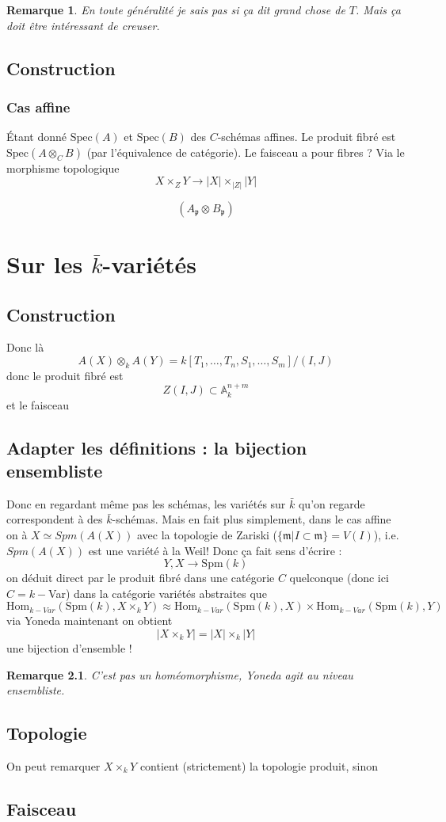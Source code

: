 \documentclass[a4paper,12pt]{book}
\newcommand{\A}{\mathbb{A}}
\newcommand{\Hom}{\textrm{Hom}}
\newcommand{\Spec}{\textrm{Spec}}
\newcommand{\Spm}{\textrm{Spm}}
\newcommand{\m}{\mathfrak{m}}
\newcommand{\p}{\mathfrak{p}}
\newcommand{\q}{\mathfrak{p}}
\theoremstyle{plain}
\newtheorem{rem}{Remarque}
\theoremstyle{definition}
\theoremstyle{remark}
\begin{document}
\begin{rem}
    En toute généralité je sais pas si ça dit grand chose de $T$. Mais
    ça doit être intéressant de creuser.
\end{rem}


\section{Construction}
\subsection{Cas affine}
Étant donné $\Spec(A)$ et $\Spec(B)$ des $C$-schémas affines. Le 
produit fibré est $\Spec(A\otimes_C B)$ (par l'équivalence de 
catégorie). Le faisceau a pour fibres ? Via le morphisme 
topologique 
\[X\times_Z Y\to |X|\times_{|Z|}|Y|\]

\[(A_\p\otimes_{} B_\q)\]
\subsection{}



\chapter{Sur les $\bar k$-variétés}
\section{Construction}
Donc là 
\[A(X)\otimes_k A(Y)=k[T_1,\ldots, T_n, S_1,\ldots, S_m]/(I,J)\]
donc le produit fibré est 
\[Z(I,J)\subset \A_k^{n+m}\]
et le faisceau
\section{Adapter les définitions : la bijection ensembliste}
Donc en regardant même pas les schémas, les variétés sur $\bar k$
qu'on regarde correspondent à des $\bar k$-schémas. Mais en 
fait plus simplement, dans le cas affine on à $X\simeq Spm(A(X))$
avec la topologie de Zariski ($\{\m|I\subset \m\}=V(I)$), i.e.
$Spm(A(X))$ est une variété à la Weil! Donc ça fait sens d'écrire :
\[Y,X\to \Spm(k)\]
on déduit direct par le produit fibré dans une catégorie $C$ 
quelconque (donc ici $C=k-$Var) dans la catégorie variétés
abstraites que
\[\Hom_{k-Var}(\Spm(k), X\times_k Y)\approx \Hom_{k-Var}(\Spm(k),X)
\times \Hom_{k-Var}(\Spm(k),Y)\]
via Yoneda maintenant on obtient 
\[|X\times_k Y|=|X|\times_k|Y|\]
une bijection d'ensemble !

\begin{rem}
  C'est pas un homéomorphisme, Yoneda agit au niveau ensembliste.
\end{rem}
\section{Topologie}
On peut remarquer $X\times_k Y$ contient (strictement) la topologie
produit, sinon 
\section{Faisceau}

\printbibliography
\end{document}

